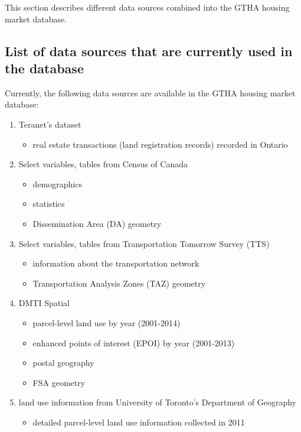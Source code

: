 This section describes different data sources combined into the GTHA housing market database.

\subsection{List of data sources that are currently used in the database} \label{subsec:list_of_data_sources}

Currently, the following data sources are available in the GTHA housing market database:

\begin{enumerate}
    \item Teranet's dataset
    \begin{itemize}
        \item real estate transactions (land registration records) recorded in Ontario
    \end{itemize}
    \item Select variables, tables from Census of Canada
    \begin{itemize}
        \item demographics
        \item statistics
        \item Dissemination Area (DA) geometry
    \end{itemize}
    \item Select variables, tables from Transportation Tomorrow Survey (TTS)
    \begin{itemize}
        \item information about the transportation network
        \item Transportation Analysis Zones (TAZ) geometry
    \end{itemize}
    \item DMTI Spatial
    \begin{itemize}
        \item parcel-level land use by year (2001-2014)
        \item enhanced points of interest (EPOI) by year (2001-2013)
        \item postal geography
        \item FSA geometry
    \end{itemize}
    \item land use information from University of Toronto's Department of Geography
    \begin{itemize}
        \item detailed parcel-level land use information collected in 2011
    \end{itemize}
\end{enumerate}

